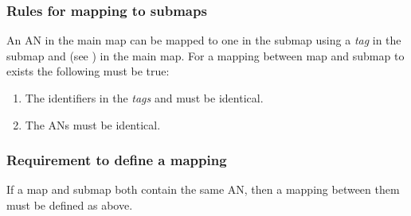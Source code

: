 \subsubsection{Rules for mapping to submaps}

An AN in the main map can be mapped to one in the submap using a \emph{tag} in the submap and  (see ) in the main map. For a mapping between map and submap to exists the following must be true:

\begin{enumerate}
\item The identifiers in the \emph{tags} and  must be identical.
\item The ANs must be identical.
\end{enumerate}

\subsubsection{Requirement to define a mapping}

If a map and submap both contain the same AN, then a mapping between them must be defined as above.